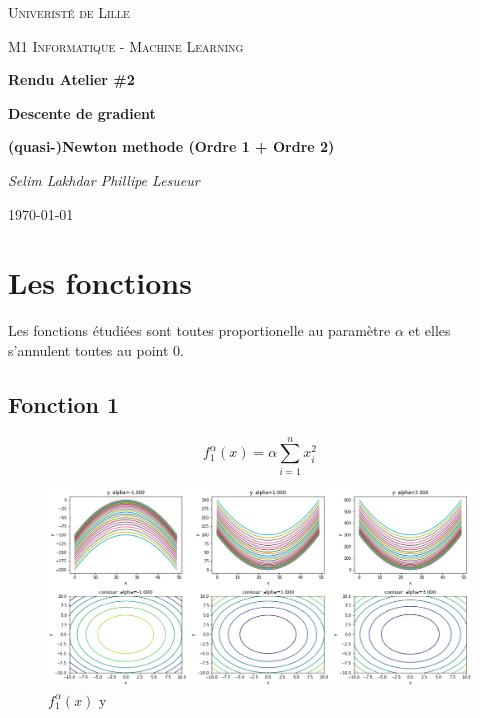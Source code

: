 \documentclass[twoside,10pt,a4paper]{article}
\numberwithin{equation}{section}					%
\numberwithin{figure}{section}						%
\begin{document}
\selectfont
\begin{titlepage}			%
	\centering
	{\scshape\LARGE Univeristé de Lille\par}
	{\scshape \LARGE M1 Informatique - Machine Learning\par}
	\vspace{1cm}
	{\huge\bfseries Rendu Atelier \#2 \par}
	{\huge\bfseries Descente de gradient \par}
	{\huge\bfseries (quasi-)Newton methode (Ordre 1 + Ordre 2) \par}
	\vspace{5cm}
	{\Large\itshape Selim Lakhdar \hfill Phillipe Lesueur \par}		%
	\vspace{5cm}
	{\large \today\par}
\end{titlepage}

\section{Les fonctions}\label{sec:section1}
Les fonctions étudiées sont toutes proportionelle au paramètre $\alpha$ et elles s'annulent toutes au point 0. 
\subsection{Fonction 1}\label{sec:subsection1}
\begin{equation}
    f_1^{\alpha}(x) = \alpha\sum_{i=1}^{n} x_i^2
    \label{eq:simple}		%
\end{equation}
\begin{figure}[H]
    \centering
    \includegraphics[width=\textwidth]{imgs/contours/f_1_texpres}
    \caption{$f_1^{\alpha}(x)$ y }
    \label{fig:mesh1}
\end{figure}
\end{document}
